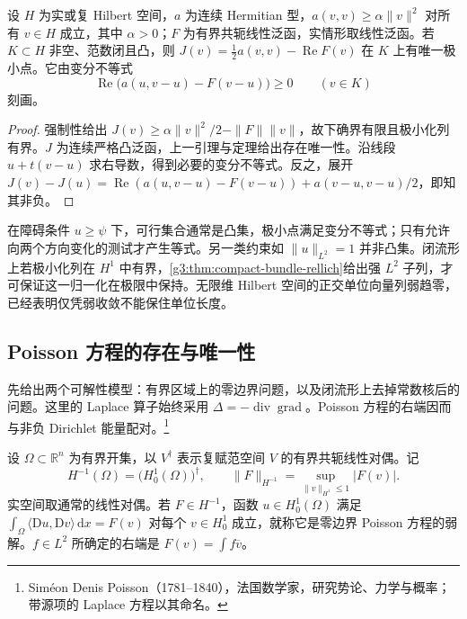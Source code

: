 \begin{corollary}\label{g3:cor:quadratic-convex-constraint}
	设 \(H\) 为实或复 Hilbert 空间，\(a\) 为连续 Hermitian 型，\(a(v,v)\ge\alpha\|v\|^2\) 对所有 \(v\in H\) 成立，其中 \(\alpha>0\)；\(F\) 为有界共轭线性泛函，实情形取线性泛函。若 \(K\subset H\) 非空、范数闭且凸，则 \(J(v)=\tfrac12a(v,v)-\operatorname{Re}F(v)\) 在 \(K\) 上有唯一极小点。它由变分不等式
	\[
		\operatorname{Re}\bigl(a(u,v-u)-F(v-u)\bigr)\ge0\qquad(v\in K)
	\]
	刻画。
\end{corollary}
\begin{proof}
	强制性给出 \(J(v)\ge\alpha\|v\|^2/2-\|F\|\|v\|\)，故下确界有限且极小化列有界。\(J\) 为连续严格凸泛函，上一引理与定理给出存在唯一性。沿线段 \(u+t(v-u)\) 求右导数，得到必要的变分不等式。反之，展开
	\(J(v)-J(u)=\operatorname{Re}(a(u,v-u)-F(v-u))+a(v-u,v-u)/2\)，即知其非负。
\end{proof}

在障碍条件 \(u\ge\psi\) 下，可行集合通常是凸集，极小点满足变分不等式；只有允许向两个方向变化的测试才产生等式。另一类约束如 \(\|u\|_{L^2}=1\) 并非凸集。闭流形上若极小化列在 \(H^1\) 中有界，\cref{g3:thm:compact-bundle-rellich}给出强 \(L^2\) 子列，才可保证这一归一化在极限中保持。无限维 Hilbert 空间的正交单位向量列弱趋零，已经表明仅凭弱收敛不能保住单位长度。

\subsection{Poisson 方程的存在与唯一性}
\label{g3:subsec:1201:04}
先给出两个可解性模型：有界区域上的零边界问题，以及闭流形上去掉常数核后的问题。这里的 Laplace 算子始终采用 \(\Delta=-\operatorname{div}\operatorname{grad}\)。Poisson 方程的右端因而与非负 Dirichlet 能量配对。\footnote{Siméon Denis Poisson（1781--1840），法国数学家，研究势论、力学与概率；带源项的 Laplace 方程以其命名。}

\begin{definition}\label{g3:def:energy-dual}
	设 \(\Omega\subset\mathbb R^n\) 为有界开集，以 \(V^\dagger\) 表示复赋范空间 \(V\) 的有界共轭线性对偶。记
	\[
		H^{-1}(\Omega)=\bigl(H_0^1(\Omega)\bigr)^\dagger,
		\qquad \|F\|_{H^{-1}}=\sup_{\|v\|_{H^1}\le1}|F(v)|.
	\]
	实空间取通常的线性对偶。若 \(F\in H^{-1}\)，函数 \(u\in H_0^1(\Omega)\) 满足
	\(\int_\Omega\langle\mathrm Du,\mathrm Dv\rangle\,\mathrm dx=F(v)\) 对每个 \(v\in H_0^1\) 成立，就称它是零边界 Poisson 方程的弱解。\(f\in L^2\) 所确定的右端是 \(F(v)=\int f\overline v\)。
\end{definition}

